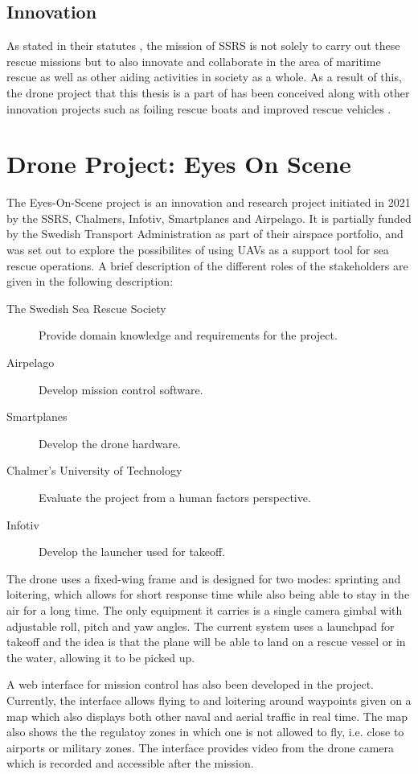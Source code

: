 \documentclass[nofilelist]{cslthse-msc}
\begin{document}
\subsection{Innovation}
As stated in their statutes \cite{ssrs-statues}, the mission of SSRS is not solely to carry out these rescue missions but to also innovate and collaborate in the area of maritime rescue as well as other aiding activities in society as a whole. As a result of this, the drone project that this thesis is a part of has been conceived along with other innovation projects such as foiling rescue boats and improved rescue vehicles \cite{surtsey-innovation}.

\section{Drone Project: Eyes On Scene}
The Eyes-On-Scene project is an innovation and research project initiated in 2021 by the SSRS, Chalmers, Infotiv, Smartplanes and Airpelago. It is partially funded by the Swedish Transport Administration as part of their airspace portfolio, and was set out to explore the possibilites of using UAVs as a support tool for sea rescue operations. A brief description of the different roles of the stakeholders are given in the following description:

\begin{description}
   \item[The Swedish Sea Rescue Society] Provide domain knowledge and requirements for the project. 
   \item[Airpelago] Develop mission control software.
   \item[Smartplanes] Develop the drone hardware.
   \item[Chalmer's University of Technology] Evaluate the project from a human factors perspective.
   \item[Infotiv] Develop the launcher used for takeoff.
\end{description}

The drone uses a fixed-wing frame and is designed for two modes: sprinting and loitering, which allows for short response time while also being able to stay in the air for a long time. The only equipment it carries is a single camera gimbal with adjustable roll, pitch and yaw angles. The current system uses a launchpad for takeoff and the idea is that the plane will be able to land on a rescue vessel or in the water, allowing it to be picked up. 

A web interface for mission control has also been developed in the project. Currently, the interface allows flying to and loitering around waypoints given on a map which also displays both other naval and aerial traffic in real time. The map also shows the the regulatoy zones in which one is not allowed to fly, i.e. close to airports or military zones. The interface provides video from the drone camera which is recorded and accessible after the mission.
\end{document}
